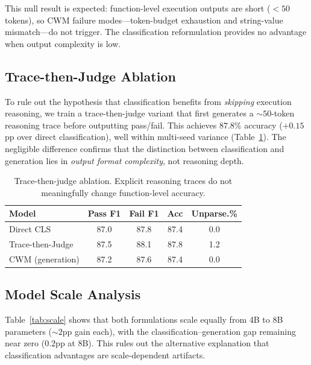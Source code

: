 \documentclass[11pt,a4paper]{article}
\begin{document}
This null result is expected: function-level execution outputs are short ($<50$ tokens), so CWM failure modes---token-budget exhaustion and string-value mismatch---do not trigger. The classification reformulation provides no advantage when output complexity is low.

\subsection{Trace-then-Judge Ablation}

To rule out the hypothesis that classification benefits from \emph{skipping} execution reasoning, we train a trace-then-judge variant that first generates a ${\sim}50$-token reasoning trace before outputting pass/fail. This achieves $87.8\%$ accuracy ($+0.15$pp over direct classification), well within multi-seed variance (Table~\ref{tab:ttj}). The negligible difference confirms that the distinction between classification and generation lies in \emph{output format complexity}, not reasoning depth.

\begin{table}[t]
\centering
\small
\caption{Trace-then-judge ablation. Explicit reasoning traces do not meaningfully change function-level accuracy.}
\label{tab:ttj}
\begin{tabular}{lcccc}
\toprule
\textbf{Model} & \textbf{Pass F1} & \textbf{Fail F1} & \textbf{Acc} & \textbf{Unparse.\%} \\
\midrule
Direct CLS & 87.0 & 87.8 & 87.4 & 0.0 \\
Trace-then-Judge & 87.5 & 88.1 & 87.8 & 1.2 \\
CWM (generation) & 87.2 & 87.6 & 87.4 & 0.0 \\
\bottomrule
\end{tabular}
\end{table}

\subsection{Model Scale Analysis}

Table~\ref{tab:scale} shows that both formulations scale equally from 4B to 8B parameters (${\sim}2$pp gain each), with the classification--generation gap remaining near zero ($0.2$pp at 8B). This rules out the alternative explanation that classification advantages are scale-dependent artifacts.
\end{document}

